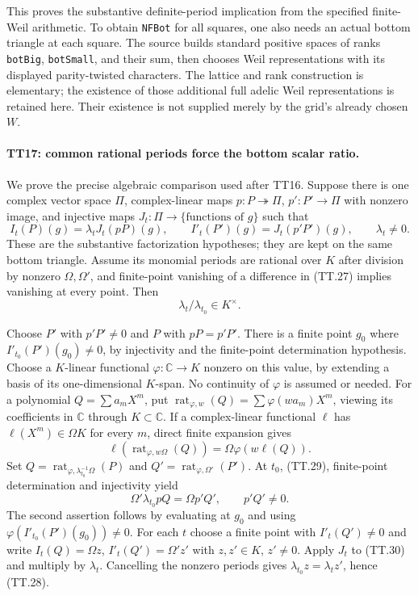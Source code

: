 This proves the substantive definite-period implication from the
specified finite-Weil arithmetic. To obtain \texttt{NFBot} for
all squares, one also needs an actual bottom triangle at each
square. The source builds standard positive spaces of ranks
\texttt{botBig}, \texttt{botSmall}, and their sum, then chooses
Weil representations with its displayed parity-twisted characters.
The lattice and rank construction is elementary; the existence
of those additional full adelic Weil representations is retained
here. Their existence is not supplied merely by the grid's
already chosen $W$.

\paragraph{TT17: common rational periods force the bottom scalar ratio.}
We prove the precise algebraic comparison used after TT16. Suppose
there is one complex vector space $\Pi$, complex-linear maps
$p:P\twoheadrightarrow\Pi$, $p':P'\to\Pi$ with nonzero image,
and injective maps $J_t:\Pi\to\{\text{functions of }g\}$ such
that
\[
 I_t(P)(g)=\lambda_tJ_t(pP)(g),\qquad
 I'_t(P')(g)=J_t(p'P')(g),\qquad\lambda_t\ne0.              \tag{TT.27}
\]
These are the substantive factorization hypotheses; they are
kept on the same bottom triangle. Assume its monomial periods
are rational over $K$ after division by nonzero $\Omega,\Omega'$,
and finite-point vanishing of a difference in (TT.27) implies
vanishing at every point. Then
\[
                       \lambda_t/\lambda_{t_0}\in K^\times.\tag{TT.28}
\]

Choose $P'$ with $p'P'\ne0$ and $P$ with $pP=p'P'$. There is a
finite point $g_0$ where $I'_{t_0}(P')(g_0)\ne0$, by injectivity
and the finite-point determination hypothesis. Choose a
$K$-linear functional $\varphi:\mathbb C\to K$ nonzero on this
value, by extending a basis of its one-dimensional $K$-span.
No continuity of $\varphi$ is assumed or needed. For a polynomial
$Q=\sum a_mX^m$, put
$\operatorname{rat}_{\varphi,w}(Q)=\sum\varphi(wa_m)X^m$,
viewing its coefficients in $\mathbb C$ through $K\subset\mathbb C$.
If a complex-linear functional $\ell$ has
$\ell(X^m)\in\Omega K$ for every $m$, direct finite expansion gives
\[
 \ell(\operatorname{rat}_{\varphi,w\Omega}(Q))
                         =\Omega\varphi(w\ell(Q)).          \tag{TT.29}
\]
Set
$Q=\operatorname{rat}_{\varphi,\lambda_{t_0}^{-1}\Omega}(P)$
and $Q'=\operatorname{rat}_{\varphi,\Omega'}(P')$.
At $t_0$, (TT.29), finite-point determination and injectivity yield
\[
             \Omega'\lambda_{t_0}pQ=\Omega p'Q',
                              \qquad p'Q'\ne0.              \tag{TT.30}
\]
The second assertion follows by evaluating at $g_0$ and using
$\varphi(I'_{t_0}(P')(g_0))\ne0$.
For each $t$ choose a finite point with $I'_t(Q')\ne0$ and write
$I_t(Q)=\Omega z$, $I'_t(Q')=\Omega'z'$ with $z,z'\in K$,
$z'\ne0$. Apply $J_t$ to (TT.30) and multiply by $\lambda_t$.
Cancelling the nonzero periods gives
$\lambda_{t_0}z=\lambda_tz'$, hence (TT.28).

